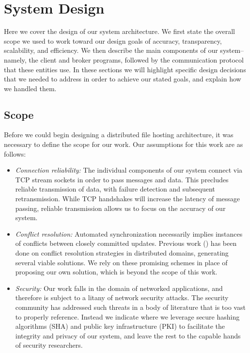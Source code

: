\section{System Design}
\label{design}
Here we cover the design of our system architecture.
We first state the overall scope we used to work toward our design goals of accuracy, transparency, scalability, and efficiency.
We then describe the main components of our system--namely, the client and broker
programs, followed by the communication protocol that these entities use.
In these sections we will highlight specific design decisions that we needed to address
in order to achieve our stated goals,
and explain how we handled them.

\subsection{Scope}
Before we could begin designing a distributed file hosting architecture,
it was necessary to define the scope for our work.
Our assumptions for this work are as follows:
\begin{itemize}
    \item \emph{Connection reliability:} The individual components of our system
    connect via TCP stream sockets in order to pass messages and data.
    This precludes reliable transmission of data, with failure detection
    and subsequent retransmission. While TCP handshakes will increase
    the latency of message passing, reliable transmission allows
    us to focus on the accuracy of our system.
    \item \emph{Conflict resolution:} Automated synchronization necessarily implies
    instances of conflicts between closely committed updates.
    Previous work (\cite{shakir1998system,hurley2004collaborative}) has been done on conflict resolution strategies in distributed domains,
    generating several viable solutions.
    We rely on these promising schemes in place of proposing our own solution,
    which is beyond the scope of this work.
    \item \emph{Security:} Our work falls in the domain
    of networked applications, and therefore is subject
    to a litany of network security attacks.
    The security community has addressed such threats
    in a body of literature that is too vast to properly reference.
    Instead we indicate where we leverage secure hashing algorithms (SHA)
    and public key infrastructure (PKI) to facilitate
    the integrity and privacy of our system,
    and leave the rest to the capable hands of security researchers.
    \end{itemize}

